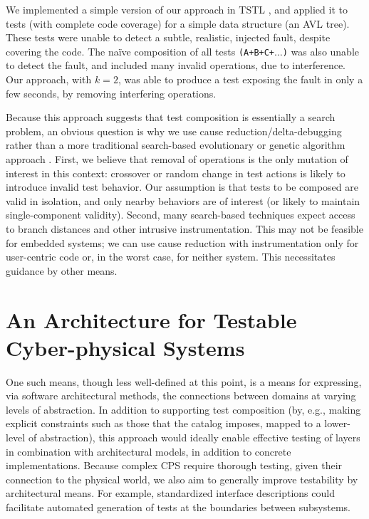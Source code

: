 We implemented a simple version of our approach in TSTL \cite{tstlsttt}, and applied
it to tests (with complete code coverage) for a simple
data structure (an AVL tree).  These tests were unable to detect a
subtle, realistic, injected fault, despite covering the code. The
na\"ive composition of all tests {\tt (A+B+C+$\ldots$)} was also unable
to detect the fault, and included many invalid operations, due to
interference.  Our approach, with $k = 2$, was able to produce a test
exposing the fault in only a few seconds, by removing interfering
operations.

Because this approach suggests that test composition is essentially a
search problem, an obvious question is why we use cause
reduction/delta-debugging rather than a more traditional search-based
evolutionary or genetic algorithm approach \cite{searchtest,McMinn04search-basedsoftware,FA11}.  First, we believe that
removal of operations is the only mutation of interest in this
context: crossover or random change in test actions is likely to
introduce invalid test behavior.  Our assumption is that tests to be
composed are valid in isolation, and only nearby behaviors are of
interest (or likely to maintain single-component validity).  Second,
many search-based techniques expect access to branch distances and
other intrusive instrumentation.  This may not be feasible for
embedded systems; we can use cause reduction with instrumentation only
for user-centric code or, in the worst case, for neither system.  This
necessitates guidance by other means.

\section{An Architecture for Testable Cyber-physical Systems}

One such means, though less well-defined at this point, is a means for expressing, via software architectural methods, the connections between domains at varying levels of abstraction.  In addition to supporting test composition (by, e.g., making explicit constraints such as those that the catalog imposes, mapped to a lower-level of abstraction), this approach would ideally enable effective testing of layers in combination with architectural models, in addition to concrete implementations.  Because complex CPS require thorough testing, given their connection to the physical world, we also aim to generally improve testability by architectural means.  For example, standardized interface descriptions could facilitate automated generation of tests at the boundaries between subsystems.

